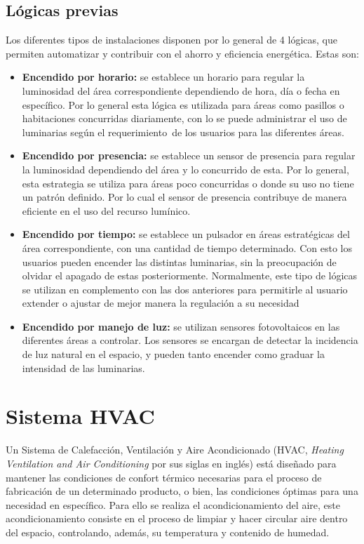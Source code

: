 \subsection{Lógicas previas}
Los diferentes tipos de instalaciones disponen por lo general de 4
lógicas, que permiten automatizar y contribuir con el ahorro y
eficiencia energética. Estas son:

\begin{itemize}
    \item \textbf{Encendido por horario:} 
se establece un horario para regular la
luminosidad del área correspondiente dependiendo de hora, día o fecha en específico. Por lo general esta lógica es utilizada para áreas como pasillos o habitaciones concurridas diariamente, con lo se puede administrar el uso de luminarias según el requerimiento de los usuarios para las diferentes áreas.

\item \textbf{Encendido por presencia:} 
se establece un sensor de presencia para
regular la luminosidad dependiendo del área y lo concurrido de esta.
Por lo general, esta estrategia se utiliza para áreas poco
concurridas o donde su uso no tiene un patrón definido. Por lo cual el
sensor de presencia contribuye de manera eficiente en el uso del
recurso lumínico.

\item \textbf{Encendido por tiempo:}
se establece un pulsador en áreas estratégicas del área correspondiente, con una cantidad de tiempo determinado. Con esto los usuarios pueden encender las distintas luminarias, sin la preocupación de olvidar el apagado de estas posteriormente. Normalmente, este tipo de lógicas se utilizan en complemento con las dos anteriores para permitirle al usuario extender o ajustar de mejor manera la regulación a su necesidad

\item \textbf{Encendido por manejo de luz:}
se utilizan sensores fotovoltaicos en
las diferentes áreas a controlar. Los sensores se encargan de
detectar la incidencia de luz natural en el espacio, y pueden tanto
encender como graduar la intensidad de las luminarias.
\end{itemize}
\section{Sistema HVAC}
Un Sistema de Calefacción, Ventilación y Aire Acondicionado (HVAC,
\textit{Heating Ventilation and Air Conditioning} por sus siglas en inglés) está diseñado para mantener las condiciones de confort térmico necesarias para el proceso de fabricación de un
determinado producto, o bien, las condiciones óptimas para una necesidad en específico. Para ello se realiza el acondicionamiento del aire, este acondicionamiento consiste en el proceso de limpiar y hacer circular aire dentro del espacio, controlando, además, su temperatura y contenido de humedad.

